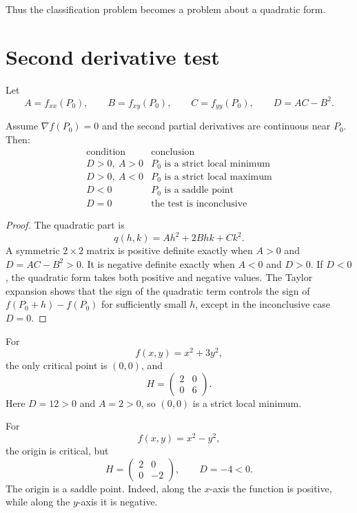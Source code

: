 Thus the classification problem becomes a problem about a quadratic form.

\section{Second derivative test}

Let
\[
  A=f_{xx}(P_0),\qquad B=f_{xy}(P_0),\qquad C=f_{yy}(P_0),\qquad D=AC-B^2.
\]

\begin{theorem}
Assume \(\nabla f(P_0)=0\) and the second partial derivatives are continuous near \(P_0\).  Then:
\[
\begin{array}{c|c}
\text{condition} & \text{conclusion}\\
\hline
D>0,\ A>0 & P_0\text{ is a strict local minimum}\\
D>0,\ A<0 & P_0\text{ is a strict local maximum}\\
D<0 & P_0\text{ is a saddle point}\\
D=0 & \text{the test is inconclusive}
\end{array}
\]
\end{theorem}

\begin{proof}
The quadratic part is
\[
  q(h,k)=Ah^2+2Bhk+Ck^2.
\]
A symmetric \(2\times2\) matrix is positive definite exactly when \(A>0\) and \(D=AC-B^2>0\).  It is negative definite exactly when \(A<0\) and \(D>0\).  If \(D<0\), the quadratic form takes both positive and negative values.  The Taylor expansion shows that the sign of the quadratic term controls the sign of \(f(P_0+h)-f(P_0)\) for sufficiently small \(h\), except in the inconclusive case \(D=0\).
\end{proof}

\begin{example}
For
\[
  f(x,y)=x^2+3y^2,
\]
the only critical point is \((0,0)\), and
\[
  H=\begin{pmatrix}2&0\\0&6\end{pmatrix}.
\]
Here \(D=12>0\) and \(A=2>0\), so \((0,0)\) is a strict local minimum.
\end{example}

\begin{example}
For
\[
  f(x,y)=x^2-y^2,
\]
the origin is critical, but
\[
  H=\begin{pmatrix}2&0\\0&-2\end{pmatrix},\qquad D=-4<0.
\]
The origin is a saddle point.  Indeed, along the \(x\)-axis the function is positive, while along the \(y\)-axis it is negative.
\end{example}

